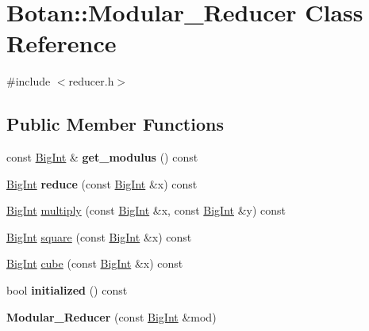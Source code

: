 \hypertarget{classBotan_1_1Modular__Reducer}{\section{Botan\-:\-:Modular\-\_\-\-Reducer Class Reference}
\label{classBotan_1_1Modular__Reducer}
}


{\ttfamily \#include $<$reducer.\-h$>$}

\subsection*{Public Member Functions}
\begin{DoxyCompactItemize}
\item 
\hypertarget{classBotan_1_1Modular__Reducer_ad21e23d5b6c34709ae49906a5931b06f}{const \hyperlink{classBotan_1_1BigInt}{Big\-Int} \& {\bfseries get\-\_\-modulus} () const }\label{classBotan_1_1Modular__Reducer_ad21e23d5b6c34709ae49906a5931b06f}

\item 
\hypertarget{classBotan_1_1Modular__Reducer_a2ad1d2db920550ee8fc6f840b6d89401}{\hyperlink{classBotan_1_1BigInt}{Big\-Int} {\bfseries reduce} (const \hyperlink{classBotan_1_1BigInt}{Big\-Int} \&x) const }\label{classBotan_1_1Modular__Reducer_a2ad1d2db920550ee8fc6f840b6d89401}

\item 
\hyperlink{classBotan_1_1BigInt}{Big\-Int} \hyperlink{classBotan_1_1Modular__Reducer_a38ad0ea07c6ba9c31611682ffa265cf3}{multiply} (const \hyperlink{classBotan_1_1BigInt}{Big\-Int} \&x, const \hyperlink{classBotan_1_1BigInt}{Big\-Int} \&y) const 
\item 
\hyperlink{classBotan_1_1BigInt}{Big\-Int} \hyperlink{classBotan_1_1Modular__Reducer_a88c4ede848cc9e8e0af4cbb532be8d7b}{square} (const \hyperlink{classBotan_1_1BigInt}{Big\-Int} \&x) const 
\item 
\hyperlink{classBotan_1_1BigInt}{Big\-Int} \hyperlink{classBotan_1_1Modular__Reducer_a35637fcd1c3a3817011124afc8a043e6}{cube} (const \hyperlink{classBotan_1_1BigInt}{Big\-Int} \&x) const 
\item 
\hypertarget{classBotan_1_1Modular__Reducer_ad9b8a99d00a015522deb2a5171a963c1}{bool {\bfseries initialized} () const }\label{classBotan_1_1Modular__Reducer_ad9b8a99d00a015522deb2a5171a963c1}

\item 
\hypertarget{classBotan_1_1Modular__Reducer_ab752e05b8c79b022be4dda899b68ca7a}{{\bfseries Modular\-\_\-\-Reducer} (const \hyperlink{classBotan_1_1BigInt}{Big\-Int} \&mod)}\label{classBotan_1_1Modular__Reducer_ab752e05b8c79b022be4dda899b68ca7a}

\end{DoxyCompactItemize}


